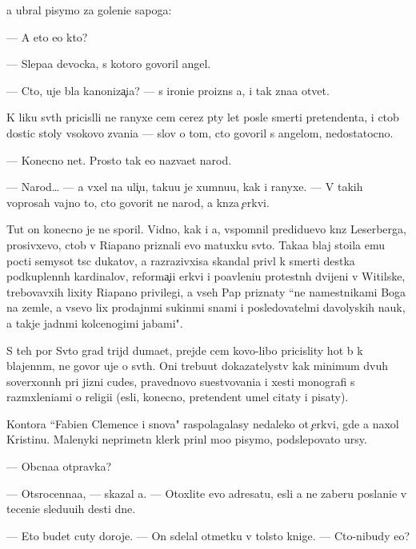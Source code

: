 \documentclass[10pt]{book}
\begin{document}
{\Y}a ubral pisymo za goleni{\x}e sapoga:

— A eto {\y}e{\x}o kto?

— Slepa{\y}a devocka, s kotoro{\y} govoril angel.

— Cto, uje b{\yi}la kanoniza{\c}i{\y}a? — s ironi{\y}e{\y} proizn{\e}s {\y}a, i tak zna{\y}a otvet.

K liku sv{\ia}t{\yi}h pricisl{\ia}li ne ranyxe cem cerez p{\ia}ty let posle smerti pretendenta, i ctob{\yi} dostic stoly v{\yi}sokovo zvani{\y}a — slov o tom, cto govoril s angelom, nedostatocno.

— Konecno net. Prosto tak {\y}e{\y}o naz{\yi}va{\y}et narod.

— Narod… — {\Y}a v{\yi}xel na uli{\c}u, taku{\y}u je xumnu{\y}u, kak i ranyxe. — V takih voprosah vajno to, cto govorit ne narod, a kn{\ia}z{\y}a {\c}erkvi.

Tut on konecno je ne sporil. Vidno, kak i {\y}a, vspomnil predidu{\x}evo kn{\ia}z{\ia} Leserberga, prosivxevo, ctob{\yi} v Riapano priznali {\y}evo matuxku sv{\ia}to{\y}. Taka{\y}a blaj sto{\y}ila {\y}emu pocti semysot t{\yi}s{\ia}c dukatov, a razrazivxi{\y}sa skandal priv{\e}l k smerti des{\ia}tka podkuplenn{\yi}h kardinalov, reforma{\c}i{\y}i {\C}erkvi i po{\y}avleni{\y}u protestn{\yi}h dvijeni{\y} v Witilske, trebovavxih lixity Riapano privilegi{\y}, a vseh Pap priznaty ``ne namestnikami Boga na zemle, a vsevo lix prodajn{\yi}mi sukin{\yi}mi s{\yi}nami i posledovatel{\ia}mi d{\y}avolyskih nauk, a takje jadn{\yi}mi kolcenogimi jabami".

S teh por Sv{\ia}to{\y} grad trijd{\yi} duma{\y}et, prejde cem kovo-libo pricislity hot{\ia} b{\yi} k blajenn{\yi}m, ne govor{\ia} uje o sv{\ia}t{\yi}h. Oni trebu{\y}ut dokazatelystv kak minimum dvuh soverxonn{\yi}h pri jizni cudes, pravednovo su{\x}estvovani{\y}a i xesti monografi{\y} s razm{\yi}xleni{\y}ami o religi{\y}i ({\y}esli, konecno, pretendent umel citaty i pisaty).

Kontora ``Fabien Clemence i s{\yi}nov{\y}a" raspolagalasy nedaleko ot {\c}erkvi, gde {\y}a naxol Kristinu. Malenyki{\y} neprimetn{\yi}{\y} klerk prin{\ia}l mo{\y}o pisymo, podslepovato {\x}ur{\ia}sy.

— Ob{\yi}cna{\y}a otpravka?

— Otsrocenna{\y}a, — skazal {\y}a. — Otoxlite {\y}evo adresatu, {\y}esli {\y}a ne zaberu poslani{\y}e v teceni{\y}e sledu{\y}u{\x}ih des{\ia}ti dne{\y}.

— Eto budet cuty doroje. — On sdelal otmetku v tolsto{\y} knige. — Cto-nibudy {\y}e{\x}o?
\end{document}
